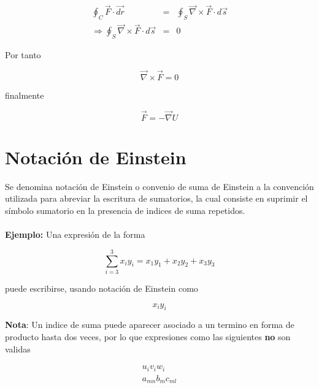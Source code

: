 \documentclass[12pt]{report}
\begin{document}
\begin{eqnarray} \nonumber
\oint_{C} \vec{F} \cdot \vec{dr} &=& \oint_{S} \vec{\nabla} \times \vec{F} \cdot d\vec{s} \\ \nonumber
\Rightarrow \oint_{S} \vec{\nabla} \times \vec{F} \cdot d\vec{s} &=& 0
\end{eqnarray}

Por tanto

\begin{equation} \nonumber
\vec{\nabla} \times \vec{F} = 0
\end{equation}

finalmente

\begin{equation} \nonumber
\vec{F}=-\vec{\nabla}U
\end{equation}











\section{Notación de Einstein}

Se denomina notación de Einstein o convenio de suma de Einstein a la convención utilizada para abreviar la escritura de sumatorios, la cual consiste en suprimir el símbolo sumatorio en la presencia de indices de suma repetidos. \\
\\

\textbf{Ejemplo:} Una expresión de la forma 

\begin{equation} \nonumber
\sum_{i=3}^3 x_iy_i = x_1y_1 + x_2y_2+x_3y_3
\end{equation}

puede escribirse, usando notación de Einstein como

\begin{equation} \nonumber
x_iy_i
\end{equation}

\textbf{Nota}: Un indice de suma puede aparecer asociado a un termino en forma de producto hasta dos veces, por lo que expresiones como las siguientes \textbf{no} son validas

\begin{eqnarray} \nonumber
u_iv_iw_i\\ \nonumber
a_{mn}b_{m}c_{ml} 
\end{eqnarray}
\end{document}
